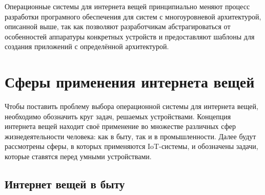 Операционные системы для интернета вещей принципиально меняют процесс разработки програмного обеспечения для систем с многоуровневой архитектурой, описанной выше, так как позволяют разработчикам абстрагироваться от особенностей аппаратуры конкретных устройств и предоставляют шаблоны для создания приложений с определённой архитектурой.








\section{Сферы применения интернета вещей}

Чтобы поставить проблему выбора операционной системы для интернета вещей, необходимо обозначить круг задач, решаемых устройствами. Концепция интернета вещей находит своё применение во множестве различных сфер жизнедеятельности человека: как в быту, так и в промышленности. Далее будут рассмотрены сферы, в которых применяются IoT-системы, и обозначены задачи, которые ставятся перед умными устройствами.

\subsection{Интернет вещей в быту}

